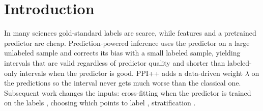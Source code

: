 \documentclass{article}
\begin{document}
\section{Introduction}
In many sciences gold-standard labels are scarce, while features and a pretrained predictor are cheap. Prediction-powered inference \citep{angelopoulos2023ppi} uses the predictor on a large unlabeled sample and corrects its bias with a small labeled sample, yielding intervals that are valid regardless of predictor quality and shorter than labeled-only intervals when the predictor is good. PPI++ \citep{angelopoulos2023ppipp} adds a data-driven weight $\lambda$ on the predictions so the interval never gets much worse than the classical one. Subsequent work changes the inputs: cross-fitting when the predictor is trained on the labels \citep{zrnic2023cross}, choosing which points to label \citep{zrnic2024active}, stratification \citep{fisch2024stratified}.
\end{document}
